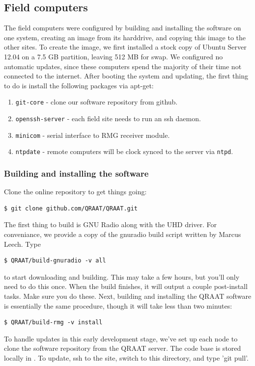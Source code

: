 \documentclass[letter]{article}
\begin{document}
\subsection{Field computers}
The field computers were configured by building and installing the software on one 
system, creating an image from its harddrive, and copying this image to the other sites. To create
the image, we first installed a stock copy of Ubuntu Server 12.04 on a 7.5 GB partition, leaving
512 MB for swap. We configured no automatic updates, since these computers spend the majority of 
their time not connected to the internet. After booting the system and updating, the first thing
to do is install the following packages via apt-get: 
\begin{enumerate}
  \item \texttt{git-core} - clone our software repository from github.
  \item \texttt{openssh-server} - each field site needs to run an ssh daemon.
  \item \texttt{minicom} - serial interface to RMG receiver module.
  \item \texttt{ntpdate} - remote computers will be clock synced to the server via \texttt{ntpd}. 
\end{enumerate}

\subsubsection{Building and installing the software}
Clone the online repository to get things going:
\begin{verbatim}
$ git clone github.com/QRAAT/QRAAT.git
\end{verbatim}
The first thing to build is GNU Radio along with the UHD driver. For conveniance, we provide a copy 
of the gnuradio build script written by Marcus Leech. Type
\begin{verbatim}
$ QRAAT/build-gnuradio -v all
\end{verbatim}
to start downloading and building. This may take a few hours, but you'll only need to do this once. When the 
build finishes, it will output a couple post-install tasks. Make sure you do these. Next, building
and installing the QRAAT software is essentially the same procedure, though it will take less than 
two minutes: 
\begin{verbatim}
$ QRAAT/build-rmg -v install
\end{verbatim}

To handle updates in this early development stage, we've set up each node to clone 
the software repository from the QRAAT server. The code base is stored locally in
. To update, ssh to the site, switch to this directory, and type
'git pull'.
\end{document}
